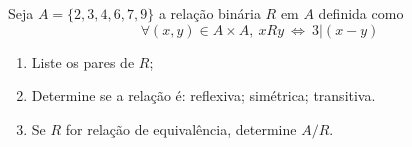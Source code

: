 \item
  Seja $A =\{2,3,4,6,7,9\}$  a relação binária $R$ em $A$ definida como
  \[ \forall (x,y) \in A\times A,\ xRy\ \Leftrightarrow\ 3|(x-y)\]
  \begin{enumerate}
	\item Liste os pares de $R$;
	\item  Determine se a relação é: reflexiva; simétrica; transitiva.
	  \item Se $R$ for relação de equivalência, determine $A/R$.
	  \end{enumerate}


